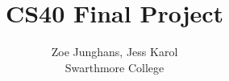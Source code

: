 \documentclass{sig-alternate}
\begin{document}
\date{}

\title{CS40 Final Project}

\author{
    Zoe Junghans, Jess Karol\\
    Swarthmore College\\
}

\maketitle



%
%







\balance
\end{document}
